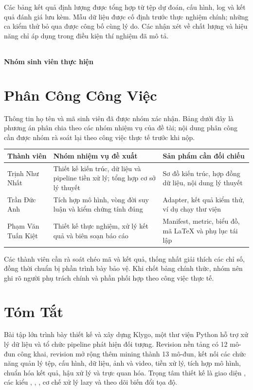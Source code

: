 Các bảng kết quả định lượng được tổng hợp từ tệp dự đoán, cấu hình, log và kết quả đánh giá lưu kèm. Mẫu dữ liệu được cố định trước thực nghiệm chính; những ca kiểm thử bỏ qua được công bố cùng lý do. Các nhận xét về chất lượng và hiệu năng chỉ áp dụng trong điều kiện thí nghiệm đã mô tả.

\begin{flushright}\textit{\ngayBaoCao}\\[0.5cm]\textbf{Nhóm sinh viên thực hiện}\end{flushright}
\clearpage

\chapter*{Phân Công Công Việc}
Thông tin họ tên và mã sinh viên đã được nhóm xác nhận. Bảng dưới đây là phương án phân chia theo các nhóm nhiệm vụ của đề tài; nội dung phân công cần được nhóm rà soát lại theo công việc thực tế trước khi nộp.
\begin{table}[H]\centering\small
\begin{tabularx}{\textwidth}{p{3.3cm}YY}
\toprule Thành viên & Nhóm nhiệm vụ đề xuất & Sản phẩm cần đối chiếu \\\midrule
Trịnh Như Nhất & Thiết kế kiến trúc, dữ liệu và pipeline tiền xử lý; tổng hợp cơ sở lý thuyết & Sơ đồ kiến trúc, hợp đồng dữ liệu, nội dung lý thuyết \\
Trần Đức Anh & Tích hợp mô hình, vòng đời suy luận và kiểm chứng tính đúng & Adapter, kết quả kiểm thử, ví dụ chạy thư viện \\
Phạm Văn Tuấn Kiệt & Thiết kế thực nghiệm, xử lý kết quả và biên soạn báo cáo & Manifest, metric, biểu đồ, mã LaTeX và phụ lục tái lập \\
\bottomrule
\end{tabularx}
\end{table}
Các thành viên cần rà soát chéo mã và kết quả, thống nhất giải thích các chỉ số, đồng thời chuẩn bị phần trình bày bảo vệ. Khi chốt bảng chính thức, nhóm nên ghi rõ người phụ trách chính và phần phối hợp theo công việc thực tế.
\clearpage

\chapter*{Tóm Tắt}
Bài tập lớn trình bày thiết kế và xây dựng Klygo, một thư viện Python hỗ trợ xử lý dữ liệu và tổ chức pipeline phát hiện đối tượng. Revision nền tảng có 12 mô-đun công khai, revision mở rộng thêm mining thành 13 mô-đun, kết nối các chức năng quản lý tệp, cấu hình, dữ liệu, ảnh và video, tiền xử lý, tích hợp mô hình, chuẩn hóa kết quả, hậu xử lý và trực quan hóa. Trọng tâm thiết kế là giao diện , các kiểu , , , cơ chế xử lý lazy và theo dõi biến đổi tọa độ.

